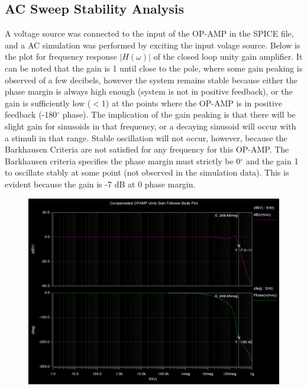 \documentclass[12pt]{article}
\begin{document}
\subsection*{AC Sweep Stability Analysis}
A voltage source was connected to the input of the OP-AMP in the SPICE file, and a AC simulation was performed by exciting the input volage source. Below is the plot for frequency response $|H(\omega)|$ of the closed loop unity gain amplifier. It can be noted that the gain is 1 until close to the pole, where some gain peaking is observed of a few decibels, however the system remains stable because either the phase margin is always high enough (system is not in positive feedback), or the gain is sufficiently low ($<$1) at the points where the OP-AMP is in positive feedback (-180$ ^\circ$ phase). The implication of the gain peaking is that there will be slight gain for sinusoids in that frequency, or a decaying sinusoid will occur with a stimuli in that range. Stable oscillation will not occur, however, because the Barkhausen Criteria are not satisfied for any frequency for this OP-AMP. The Barkhausen criteria specifies the phase margin must strictly be 0$ ^\circ$ and the gain 1 to oscillate stably at some point (not observed in the simulation data). This is evident because the gain is -7 dB at 0 phase margin.
\begin{figure}[h!] 
\begin{center}
 \includegraphics[scale=0.28]{./follower.png}
\end{center}
\end{figure}
\FloatBarrier
\end{document}
